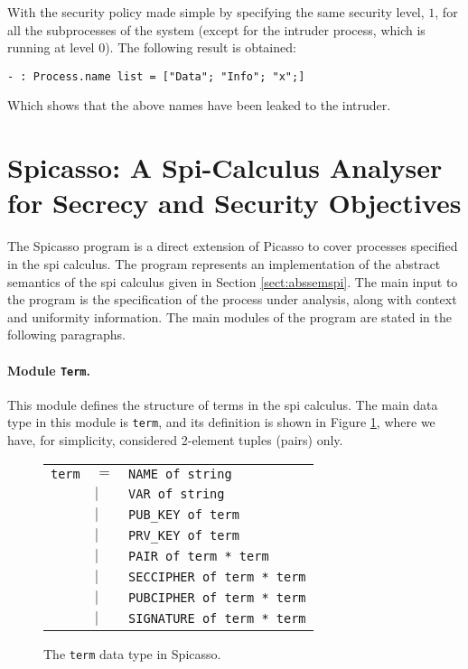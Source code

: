 \documentclass[10pt,a4paper,final,oneside,fleqn]{book}
\begin{document}
\noindent
With the security policy made simple by specifying the same security level, $1$, for all the subprocesses of the system (except for the intruder process, which is running at level $0$).  The following result is obtained:\vspace{6mm}

\noindent
\texttt{- : Process.name list = ["Data"; "Info"; "x";]}\vspace{6mm}

\noindent
Which shows that the above names have been leaked to the intruder.
\clearpage
\section{Spicasso: A Spi-Calculus Analyser for Secrecy and Security Objectives}
The Spicasso program is a direct extension of Picasso to cover processes specified in the spi calculus.  The program represents an implementation of the abstract semantics of the spi calculus given in Section \ref{sect:abssemspi}. The main input to the program is the specification of the process under analysis, along with context and uniformity information.  The main modules of the program are stated in the following paragraphs.

\paragraph{Module \texttt{Term}.}  This module defines the structure of terms in the spi calculus.  The main data type in this module is \texttt{term}, and its definition is shown in Figure \ref{termtype}, where we have, for simplicity, considered 2-element tuples (pairs) only.
\begin{figure}[bht]
\begin{center}
\begin{tabular}{|lll|}
\hline
\texttt{term}&$=$&\texttt{NAME of string}\\
&$\mid$&\texttt{VAR of string}\\
&$\mid$&\texttt{PUB\_KEY of term}\\
&$\mid$&\texttt{PRV\_KEY of term}\\
&$\mid$&\texttt{PAIR of term * term}\\
&$\mid$&\texttt{SECCIPHER of term * term}\\
&$\mid$&\texttt{PUBCIPHER of term * term}\\
&$\mid$&\texttt{SIGNATURE of term * term}\\
\hline
\end{tabular}
\end{center}
\caption{The \texttt{term} data type in Spicasso.\label{termtype}}
\end{figure}
\end{document}
